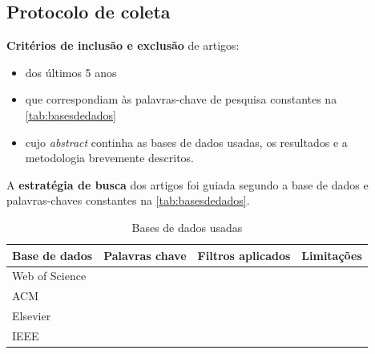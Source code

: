 		\subsection{Protocolo de coleta}
		
			\par \textbf{Critérios de inclusão e exclusão} de artigos:
			\begin{itemize}
				\item dos últimos 5 anos
				\item que correspondiam às palavras-chave de pesquisa constantes na \autoref{tab:basesdedados}
				\item cujo \textit{abstract} continha as bases de dados usadas, os resultados e a metodologia brevemente descritos.
			\end{itemize}
			
			
			\par A \textbf{estratégia de busca} dos artigos foi guiada segundo a base de dados e palavras-chaves constantes na \autoref{tab:basesdedados}.
			\begin{table}[H]
				\begin{center}
					\caption[Bases de dados usadas]{Bases de dados usadas}
					\begin{tabular}{|l|l|l|l|}
						\hline
						Base de dados & Palavras chave & Filtros aplicados & Limitações \\
						\hline
						Web of Science & & & \\
						\hline
						ACM & & & \\
						\hline
						Elsevier & & & \\
						\hline
						IEEE & & & \\
						\hline
					\end{tabular}
					\label{tab:basesdedados}
				\end{center}
			\end{table}
		
			
			
			
